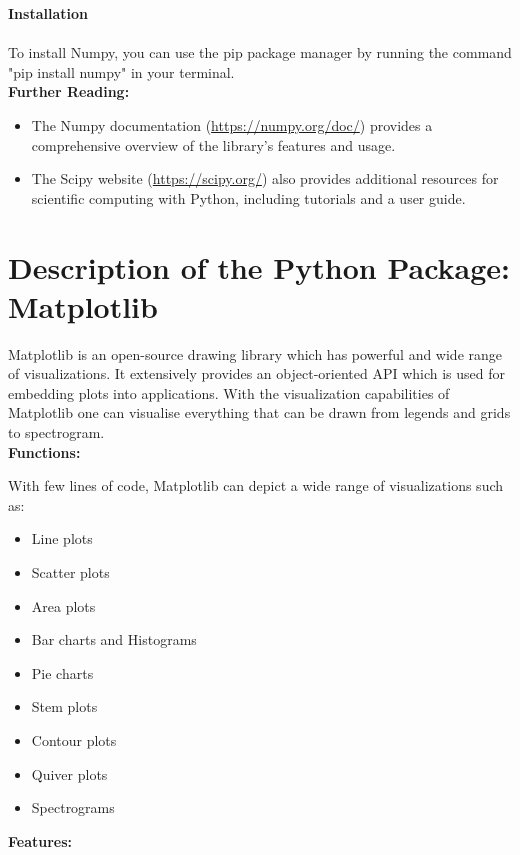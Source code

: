 \textbf{Installation}\\\\
To install Numpy, you can use the pip package manager by running the command "pip install numpy" in your terminal.\\

\textbf{Further Reading:}

\begin{itemize}
	\item The Numpy documentation (\url{https://numpy.org/doc/}) provides a comprehensive overview of the library's features and usage.
	\item The Scipy website (\url{https://scipy.org/}) also provides additional resources for scientific computing with Python, including tutorials and a user guide.
\end{itemize}



\section{Description of the Python Package: Matplotlib}

Matplotlib is an open-source drawing library which has powerful and wide range of visualizations. It extensively provides an object-oriented API which is used for embedding plots into applications. With the visualization capabilities of Matplotlib one can visualise everything that can be drawn from legends and grids to spectrogram. \cite{Duggal:2022}\cite{Desai:2019} \\

\textbf{Functions:}

With few lines of code, Matplotlib can depict a wide range of visualizations such as:
\begin{itemize}
	\item Line plots
	\item Scatter plots
	\item Area plots
	\item Bar charts and Histograms
	\item Pie charts
	\item Stem plots
	\item Contour plots
	\item Quiver plots
	\item Spectrograms
\end{itemize}

\textbf{Features:}

